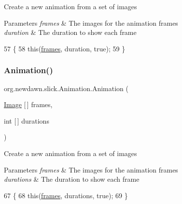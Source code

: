 Create a new animation from a set of images


\begin{DoxyParams}{Parameters}
{\em frames} & The images for the animation frames \\
\hline
{\em duration} & The duration to show each frame \\
\hline
\end{DoxyParams}

\begin{DoxyCode}
57                                                    \{
58         \textcolor{keyword}{this}(\mbox{\hyperlink{classorg_1_1newdawn_1_1slick_1_1_animation_a39f0c6a16e479985b22f7dd3bb781bf7}{frames}}, duration, \textcolor{keyword}{true});
59     \}
\end{DoxyCode}
\mbox{\label{classorg_1_1newdawn_1_1slick_1_1_animation_a91f5bff0ba683a4c9d319c4fc471dcf8}} 
\subsubsection{\texorpdfstring{Animation()}{Animation()}\hspace{0.1cm}{\footnotesize\ttfamily [3/9]}}
{\footnotesize\ttfamily org.\+newdawn.\+slick.\+Animation.\+Animation (\begin{DoxyParamCaption}\item[{\mbox{\hyperlink{classorg_1_1newdawn_1_1slick_1_1_image}{Image}} \mbox{[}$\,$\mbox{]}}]{frames,  }\item[{int \mbox{[}$\,$\mbox{]}}]{durations }\end{DoxyParamCaption})\hspace{0.3cm}{\ttfamily [inline]}}

Create a new animation from a set of images


\begin{DoxyParams}{Parameters}
{\em frames} & The images for the animation frames \\
\hline
{\em durations} & The duration to show each frame \\
\hline
\end{DoxyParams}

\begin{DoxyCode}
67                                                       \{
68         \textcolor{keyword}{this}(\mbox{\hyperlink{classorg_1_1newdawn_1_1slick_1_1_animation_a39f0c6a16e479985b22f7dd3bb781bf7}{frames}}, durations, \textcolor{keyword}{true});
69     \}
\end{DoxyCode}
\mbox{\label{classorg_1_1newdawn_1_1slick_1_1_animation_a321d51203eb9e4fc1fbbcacd0eafb79b}} 
